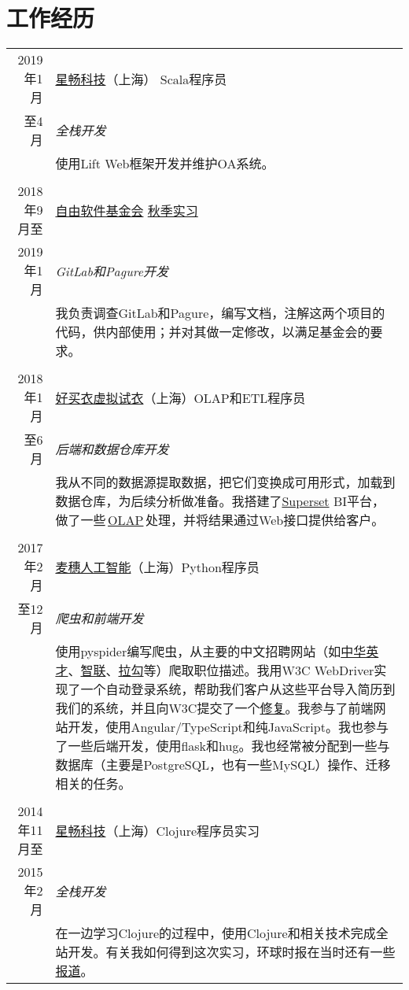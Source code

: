 \documentclass[a4paper,11pt]{article}
\begin{document}
\section{工作经历}
\begin{tabularx}{\textwidth}{r|X}
  2019年1月    & \href{http://www.starworking.com/}{星畅科技}（上海） \hfill Scala程序员 \\
  至4月        & \emph{全栈开发} \\
               & \footnotesize 使用Lift Web框架开发并维护OA系统。\\
  \multicolumn{2}{c}{} \\
  2018年9月至  & \href{https://www.fsf.org/}{自由软件基金会} \hfill \href{https://www.fsf.org/blogs/sysadmin/introducing-lei-zhao-intern-with-the-fsf-tech-team}{秋季实习} \\
  2019年1月    & \emph{GitLab和Pagure开发} \\
               & \footnotesize 我负责调查GitLab和Pagure，编写文档，注解这两个项目的代码，供内部使用；并对其做一定修改，以满足基金会的要求。\\
  \multicolumn{2}{c}{} \\
  2018年1月    & \href{https://www.haomaiyi.com/}{好买衣虚拟试衣}（上海）\hfill OLAP和ETL程序员 \\
  至6月        & \emph{后端和数据仓库开发}\\
               & \footnotesize 我从不同的数据源提取数据，把它们变换成可用形式，加载到数据仓库，为后续分析做准备。我搭建了\href{https://superset.incubator.apache.org/}{Superset} BI平台，做了一些\,\href{https://wiki.mbalib.com/wiki/\%E8\%81\%94\%E6\%9C\%BA\%E5\%88\%86\%E6\%9E\%90\%E5\%A4\%84\%E7\%90\%86}{OLAP}\,处理，并将结果通过Web接口提供给客户。\\
  \multicolumn{2}{c}{} \\
  2017年2月    & \href{https://www.mesoor.com/}{麦穗人工智能}（上海）\hfill Python程序员 \\
  至12月       & \emph{爬虫和前端开发}\\
               & \footnotesize 使用pyspider编写爬虫，从主要的中文招聘网站（如\href{http://www.chinahr.com/}{中华英才}、\href{https://www.zhaopin.com/}{智联}、\href{https://www.lagou.com/}{拉勾}等）爬取职位描述。我用W3C WebDriver实现了一个自动登录系统，帮助我们客户从这些平台导入简历到我们的系统，并且向W3C提交了一个\href{https://github.com/w3c/web-platform-tests/pull/6743}{修复}。我参与了前端网站开发，使用Angular/TypeScript和纯JavaScript。我也参与了一些后端开发，使用flask和hug。我也经常被分配到一些与数据库（主要是PostgreSQL，也有一些MySQL）操作、迁移相关的任务。\\
  \multicolumn{2}{c}{} \\
  2014年11月至 & \href{http://www.starworking.com/}{星畅科技}（上海）\hfill Clojure程序员实习 \\
  2015年2月    & \emph{全栈开发}\\
               & \footnotesize 在一边学习Clojure的过程中，使用Clojure和相关技术完成全站开发。有关我如何得到这次实习，环球时报在当时还有一些\href{http://www.globaltimes.cn/content/871111.shtml}{报道}。
\end{tabularx}
\end{document}
